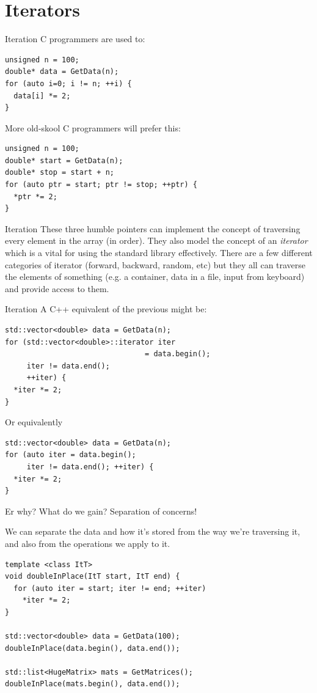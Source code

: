 \documentclass[presentation,t]{beamer}
\newcommand{\code}[1]{\lstinline!#1!}
\begin{document}
\section{Iterators}
\begin{frame}[fragile]{Iteration}
C programmers are used to:
\begin{lstlisting}
unsigned n = 100;
double* data = GetData(n);
for (auto i=0; i != n; ++i) {
  data[i] *= 2;
}
\end{lstlisting}

More old-skool C programmers will prefer this:
\begin{lstlisting}
unsigned n = 100;
double* start = GetData(n);
double* stop = start + n;
for (auto ptr = start; ptr != stop; ++ptr) {
  *ptr *= 2;
}
\end{lstlisting}
\end{frame}
\begin{frame}{Iteration}
These three humble pointers can implement the concept of traversing
every element in the array (in order).
\vfill
They also model the concept of an \emph{iterator} which is a vital for
using the standard library effectively.
\vfill
There are a few different categories of iterator (forward, backward,
random, etc) but they all can traverse the elements of something
(e.g. a container, data in a file, input from keyboard) and provide
access to them.
\end{frame}

\begin{frame}[fragile]{Iteration}
  A C++ equivalent of the previous might be:
\begin{lstlisting}
std::vector<double> data = GetData(n);
for (std::vector<double>::iterator iter 
                                = data.begin();
     iter != data.end();
     ++iter) {
  *iter *= 2;
}
\end{lstlisting}
\pause
Or equivalently
\begin{lstlisting}
std::vector<double> data = GetData(n);
for (auto iter = data.begin();
     iter != data.end(); ++iter) {
  *iter *= 2;
}
\end{lstlisting}

\end{frame}

\begin{frame}[fragile]{Er why?}
  What do we gain? \pause Separation of concerns!

  We can separate the data and how it's stored from the way we're
  traversing it, and also from the operations we apply to it.

  \pause
\begin{lstlisting}
template <class ItT>
void doubleInPlace(ItT start, ItT end) {
  for (auto iter = start; iter != end; ++iter)
    *iter *= 2;
}

std::vector<double> data = GetData(100);
doubleInPlace(data.begin(), data.end());

std::list<HugeMatrix> mats = GetMatrices();
doubleInPlace(mats.begin(), data.end());

\end{lstlisting}
\end{frame}
\end{document}
